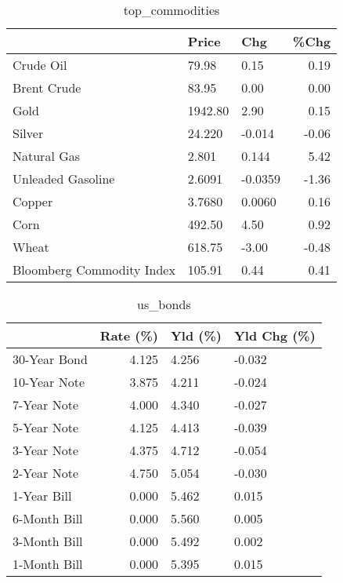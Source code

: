 \documentclass{article}%
\begin{document}
\begin{table}[htbp]%
\caption{top\_commodities}%
\centering%
\begin{adjustbox}{width=1\textwidth}%
\begin{tabular}{lllr}
\toprule
                          &   Price &     Chg &  \%Chg \\
\midrule
               Crude Oil  &   79.98 &    0.15 &  0.19 \\
             Brent Crude  &   83.95 &    0.00 &  0.00 \\
                    Gold  & 1942.80 &    2.90 &  0.15 \\
                  Silver  &  24.220 &  -0.014 & -0.06 \\
             Natural Gas  &   2.801 &   0.144 &  5.42 \\
       Unleaded Gasoline  &  2.6091 & -0.0359 & -1.36 \\
                  Copper  &  3.7680 &  0.0060 &  0.16 \\
                    Corn  &  492.50 &    4.50 &  0.92 \\
                   Wheat  &  618.75 &   -3.00 & -0.48 \\
Bloomberg Commodity Index &  105.91 &    0.44 &  0.41 \\
\bottomrule
\end{tabular}
%
\end{adjustbox}%
\end{table}

%


\begin{table}[htbp]%
\caption{us\_bonds}%
\centering%
\begin{adjustbox}{width=1\textwidth}%
\begin{tabular}{lrll}
\toprule
             &  Rate (\%) & Yld (\%) & Yld Chg (\%) \\
\midrule
30-Year Bond &     4.125 &   4.256 &      -0.032 \\
10-Year Note &     3.875 &   4.211 &      -0.024 \\
 7-Year Note &     4.000 &   4.340 &      -0.027 \\
 5-Year Note &     4.125 &   4.413 &      -0.039 \\
 3-Year Note &     4.375 &   4.712 &      -0.054 \\
 2-Year Note &     4.750 &   5.054 &      -0.030 \\
 1-Year Bill &     0.000 &   5.462 &       0.015 \\
6-Month Bill &     0.000 &   5.560 &       0.005 \\
3-Month Bill &     0.000 &   5.492 &       0.002 \\
1-Month Bill &     0.000 &   5.395 &       0.015 \\
\bottomrule
\end{tabular}
%
\end{adjustbox}%
\end{table}
\end{document}
